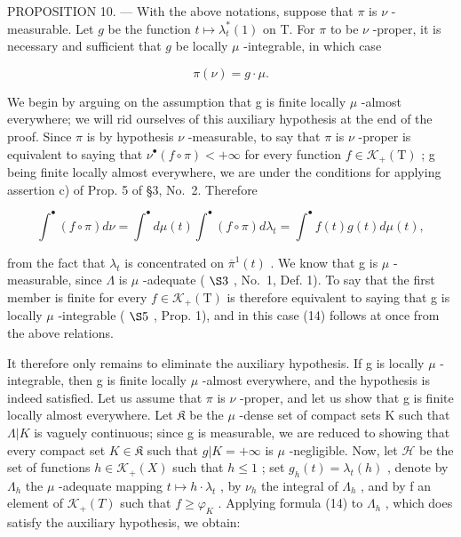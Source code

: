 PROPOSITION 10. --- With the above notations, suppose that \(\pi\) is \(\nu\) -measurable. Let \(g\) be the function \(t \mapsto \lambda_t^*(1)\) on T. For \(\pi\) to be \(\nu\) -proper, it is necessary and sufficient that \(g\) be locally \(\mu\) -integrable, in which case

\[
\pi (\nu) = g \cdot \mu .\tag{14}
\]

We begin by arguing on the assumption that g is finite locally \(\mu\) -almost everywhere; we will rid ourselves of this auxiliary hypothesis at the end of the proof. Since \(\pi\) is by hypothesis \(\nu\) -measurable, to say that \(\pi\) is \(\nu\) -proper is equivalent to saying that \(\nu^{\bullet}(f\circ\pi)<+\infty\) for every function \(f\in\mathcal{K}_{+}(\mathrm{T})\) ; g being finite locally almost everywhere, we are under the conditions for applying assertion c) of Prop. 5 of §3, No.~2. Therefore

\[
\int^ {\bullet} (f \circ \pi) d \nu = \int^ {\bullet} d \mu (t) \int^ {\bullet} (f \circ \pi) d \lambda_ {t} = \int^ {\bullet} f (t) g (t) d \mu (t),
\]

from the fact that \(\lambda_{t}\) is concentrated on \(\overline{\pi}^{1}(t)\) . We know that g is \(\mu\) -measurable, since \(\Lambda\) is \(\mu\) -adequate ( \(\S3\) , No.~1, Def. 1). To say that the first member is finite for every \(f \in \mathcal{K}_{+}(\mathrm{T})\) is therefore equivalent to saying that g is locally \(\mu\) -integrable ( \(\S5\) , Prop. 1), and in this case (14) follows at once from the above relations.

It therefore only remains to eliminate the auxiliary hypothesis. If g is locally \(\mu\) -integrable, then g is finite locally \(\mu\) -almost everywhere, and the hypothesis is indeed satisfied. Let us assume that \(\pi\) is \(\nu\) -proper, and let us show that g is finite locally almost everywhere. Let \(\mathfrak{K}\) be the \(\mu\) -dense set of compact sets K such that \(\Lambda|K\) is vaguely continuous; since g is measurable, we are reduced to showing that every compact set \(K \in \mathfrak{K}\) such that \(g|K = +\infty\) is \(\mu\) -negligible. Now, let \(\mathcal{H}\) be the set of functions \(h \in \mathcal{K}_{+}(X)\) such that \(h \leqslant 1\) ; set \(g_{h}(t) = \lambda_{t}(h)\) , denote by \(\Lambda_{h}\) the \(\mu\) -adequate mapping \(t \mapsto h \cdot \lambda_{t}\) , by \(\nu_{h}\) the integral of \(\Lambda_{h}\) , and by f an element of \(\mathcal{K}_{+}(T)\) such that \(f \geqslant \varphi_{K}\) . Applying formula (14) to \(\Lambda_{h}\) , which does satisfy the auxiliary hypothesis, we obtain:

